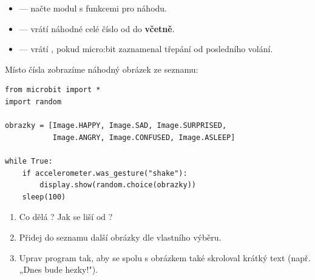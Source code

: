 \begin{ukol}
\odpoved[2.5cm]

\begin{tcolorbox}[colback=code-bg, colframe=gray!40,
                  fonttitle=\small\bfseries, title=import a randint]
  \small
  \begin{itemize}[leftmargin=*]
    \item {} — načte modul s funkcemi pro náhodu.
    \item {} — vrátí náhodné celé číslo
          od  do  \textbf{včetně}.
    \item {} — vrátí ,
          pokud micro:bit zaznamenal třepání od posledního volání.
  \end{itemize}
\end{tcolorbox}

\end{ukol}

\begin{ukol}

Místo čísla zobrazíme náhodný obrázek ze seznamu:

\begin{lstlisting}
from microbit import *
import random

obrazky = [Image.HAPPY, Image.SAD, Image.SURPRISED,
           Image.ANGRY, Image.CONFUSED, Image.ASLEEP]

while True:
    if accelerometer.was_gesture("shake"):
        display.show(random.choice(obrazky))
    sleep(100)
\end{lstlisting}

\begin{enumerate}
  \item Co dělá ?
        Jak se liší od ?
  \item Přidej do seznamu  další obrázky dle vlastního výběru.
  \item Uprav program tak, aby se spolu s obrázkem také skroloval krátký text
        (např. „Dnes bude hezky!").
\end{enumerate}

\odpoved[2cm]

\end{ukol}

